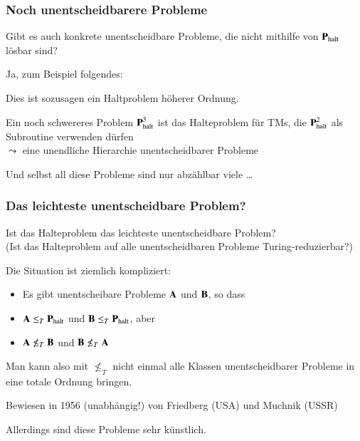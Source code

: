 \documentclass[onlymath]{beamer}
\begin{document}
\begin{frame}\frametitle{Noch unentscheidbarere Probleme}

Gibt es auch konkrete unentscheidbare Probleme, die nicht
mithilfe von $\textbf{\textcolor{black}{P}}_{\text{halt}}$ lösbar sind?
\bigskip\pause

Ja, zum Beispiel folgendes:


Dies ist sozusagen ein Haltproblem höherer Ordnung.\bigskip\pause

Ein noch schwereres Problem $\textbf{\textcolor{black}{P}}^3_{\text{halt}}$ ist
das Halteproblem für TMs, die $\textbf{\textcolor{black}{P}}^2_{\text{halt}}$ als Subroutine
verwenden dürfen\\
$\leadsto$ \alert{eine unendliche Hierarchie unentscheidbarer Probleme}
\bigskip\pause

Und selbst all diese Probleme sind nur abzählbar viele \ldots

\end{frame}

\begin{frame}\frametitle{Das leichteste unentscheidbare Problem?}

\begin{center}
\alert{Ist das Halteproblem das leichteste unentscheidbare Problem?}\\
{\tiny (Ist das Halteproblem auf alle unentscheidbaren Probleme Turing-reduzierbar?)}
\end{center}

\bigskip
\pause {}
\bigskip

Die Situation ist ziemlich kompliziert:
\begin{itemize}
\item Es gibt unentscheibare Probleme $\textbf{\textcolor{black}{A}}$ und $\textbf{\textcolor{black}{B}}$, so dass
\item $\textbf{\textcolor{black}{A}}\leq_T \textbf{\textcolor{black}{P}}_{\text{halt}}$ und $\textbf{\textcolor{black}{B}}\leq_T \textbf{\textcolor{black}{P}}_{\text{halt}}$, aber
\item $\textbf{\textcolor{black}{A}}\not\leq_T \textbf{\textcolor{black}{B}}$ und $\textbf{\textcolor{black}{B}}\not\leq_T \textbf{\textcolor{black}{A}}$
\end{itemize}

Man kann also mit $\not\leq_T$ nicht einmal alle Klassen unentscheidbarer Probleme
in eine totale Ordnung bringen.

{\tiny Bewiesen in 1956 (unabhängig!) von Friedberg (USA) und Muchnik (USSR)}
\bigskip

Allerdings sind diese Probleme sehr künstlich.

\end{frame}
\end{document}
